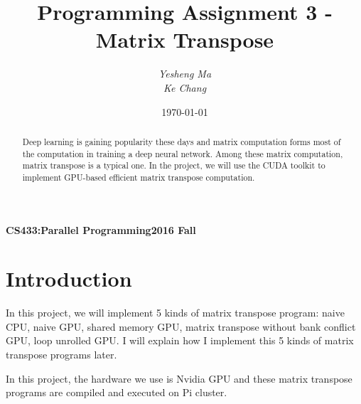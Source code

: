 \documentclass{article}
\begin{document}
\title{Programming Assignment 3 - Matrix Transpose}
\author{\textit{Yesheng Ma}\\\textit{Ke Chang}}
\date{\today}
{\bf\small CS433:Parallel Programming}\hfill{\bf\small 2016 Fall}
{\let\newpage\relax\maketitle}
\maketitle


\begin{abstract}
Deep learning is gaining popularity these days and matrix computation forms most of the computation in training a deep neural network. Among these matrix computation, matrix transpose is a typical one. In the project, we will use the CUDA toolkit to implement GPU-based efficient matrix transpose computation.
\end{abstract}


\section{Introduction}
In this project, we will implement 5 kinds of matrix transpose program: naive CPU, naive GPU, shared memory GPU,  matrix transpose without bank conflict GPU, loop unrolled GPU. I will explain how I implement this 5 kinds of matrix transpose programs later.

In this project, the hardware we use is Nvidia GPU and these matrix transpose programs are compiled and executed on Pi cluster.
\end{document}
